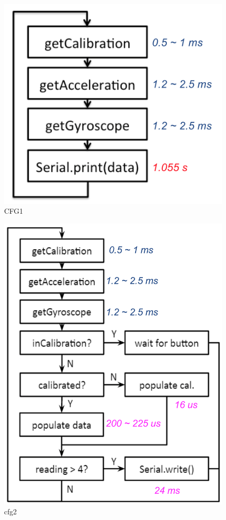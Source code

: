 \documentclass[10pt,journal]{IEEEtran}
\begin{document}
\begin{figure}[h]
    \includegraphics[width=0.8\linewidth]{figures/cfg1}
  \caption{CFG1}
  \label{fig:cfg1}
\end{figure}
\begin{figure}[H]
    \includegraphics[width=0.8\linewidth]{figures/cfg2}
  \caption{cfg2}
  \label{fig:cfg2}
\end{figure}
\end{document}

